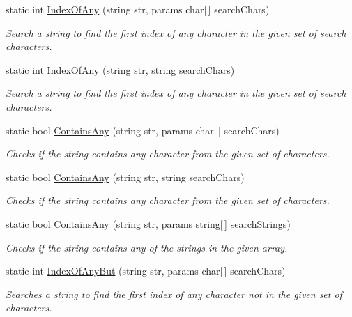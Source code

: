 \begin{DoxyCompactItemize}
static int \hyperlink{class_ultimate_1_1_utilities_1_1_string_utils_a60e927328b08d4fdb0740bdb145c6d16}{Index\+Of\+Any} (string str, params char\mbox{[}$\,$\mbox{]} search\+Chars)
\begin{DoxyCompactList}\small\item\em Search a string to find the first index of any character in the given set of search characters. \end{DoxyCompactList}\item 
static int \hyperlink{class_ultimate_1_1_utilities_1_1_string_utils_af15d76d2e0212a5e22c1cef98c745b0a}{Index\+Of\+Any} (string str, string search\+Chars)
\begin{DoxyCompactList}\small\item\em Search a string to find the first index of any character in the given set of search characters. \end{DoxyCompactList}\item 
static bool \hyperlink{class_ultimate_1_1_utilities_1_1_string_utils_ac5542a783710665a77622f07e7bbcf63}{Contains\+Any} (string str, params char\mbox{[}$\,$\mbox{]} search\+Chars)
\begin{DoxyCompactList}\small\item\em Checks if the string contains any character from the given set of characters. \end{DoxyCompactList}\item 
static bool \hyperlink{class_ultimate_1_1_utilities_1_1_string_utils_a9bb7ad7a5dda3268be32f479b8ac26ce}{Contains\+Any} (string str, string search\+Chars)
\begin{DoxyCompactList}\small\item\em Checks if the string contains any character from the given set of characters. \end{DoxyCompactList}\item 
static bool \hyperlink{class_ultimate_1_1_utilities_1_1_string_utils_a1be9e644984cc4e7e8075841c1b44f9b}{Contains\+Any} (string str, params string\mbox{[}$\,$\mbox{]} search\+Strings)
\begin{DoxyCompactList}\small\item\em Checks if the string contains any of the strings in the given array. \end{DoxyCompactList}\item 
static int \hyperlink{class_ultimate_1_1_utilities_1_1_string_utils_a336f111d7dd2bad37e688de91041f1da}{Index\+Of\+Any\+But} (string str, params char\mbox{[}$\,$\mbox{]} search\+Chars)
\begin{DoxyCompactList}\small\item\em Searches a string to find the first index of any character not in the given set of characters. \end{DoxyCompactList}\item 

\end{DoxyCompactItemize}
